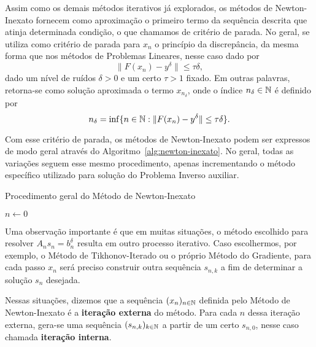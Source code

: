 Assim como os demais métodos iterativos já explorados, os métodos de Newton-Inexato fornecem como aproximação o primeiro termo da sequência descrita que atinja determinada condição, o que chamamos de critério de parada. No geral, se utiliza como critério de parada para $x_n$ o princípio da discrepância, da mesma forma que nos métodos de Problemas Lineares, nesse caso dado por
\begin{equation}\label{eq:discrepancia-nao-linear}
    \|F(x_n) - y^\delta\| \leq \tau \delta,
\end{equation}
dado um nível de ruídos $\delta>0$ e um certo $\tau>1$ fixado. Em outras palavras, retorna-se como solução aproximada o termo $x_{n_\delta}$, onde o índice $n_\delta \in \mathbb N$ é definido por
\begin{equation}\label{eq:indice-discrepancia-nao-linear}
      n_\delta = \inf \{n \in \mathbb N : \|F(x_n) - y^\delta\| \leq \tau \delta \}.
\end{equation}

Com esse critério de parada, os métodos de Newton-Inexato podem ser expressos de modo geral através do Algoritmo~\ref{alg:newton-inexato}. No geral, todas as variações seguem esse mesmo procedimento, apenas incrementando o método específico utilizado para solução do Problema Inverso auxiliar.

\begin{algorithm}[H] \label{alg:newton-inexato}
    \LinesNumbered
    \caption{Procedimento geral do Método de Newton-Inexato}
    $n \gets 0$ \\
\end{algorithm}

Uma observação importante é que em muitas situações, o método escolhido para resolver $A_n s_n = b_n^\delta$ resulta em outro processo iterativo. Caso escolhermos, por exemplo, o Método de Tikhonov-Iterado ou o próprio Método do Gradiente, para cada passo $x_n$ será preciso construir outra sequência $s_{n,k}$ a fim de determinar a solução $s_n$ desejada.

Nessas situações, dizemos que a sequência $(x_n)_{n\in \mathbb N}$ definida pelo Método de Newton-Inexato é a \textbf{iteração externa} do método. Para cada $n$ dessa iteração externa, gera-se uma sequência $(s_{n,k})_{k \in \mathbb N}$ a partir de um certo $s_{n,0}$, nesse caso chamada \textbf{iteração interna}. 

